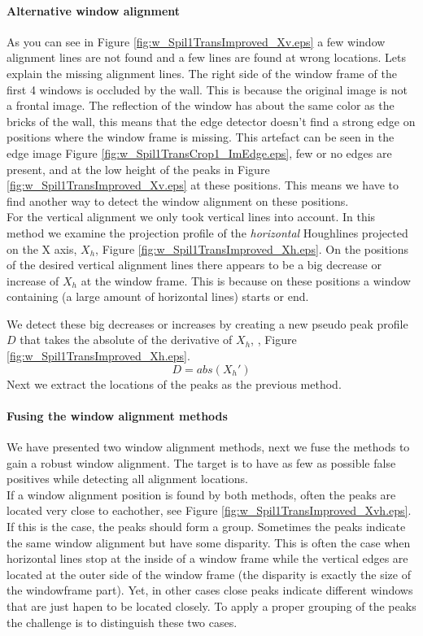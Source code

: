 \paragraph{Alternative window alignment}
As you can see in Figure \ref{fig:w_Spil1TransImproved_Xv.eps}
a few window alignment lines are not found and a few lines are found at wrong locations.
Lets explain the missing alignment lines.
The right side of the window frame of the first 4 windows is occluded by the
wall. This is because the original image is not a frontal image.
The reflection of the window has about the same color as the bricks of
the wall, this means that the edge detector
doesn't find a strong edge on positions where the window frame is missing.
This artefact can be seen in the edge image Figure \ref{fig:w_Spil1TransCrop1_ImEdge.eps}, few or no edges are present, and
at the low height of the peaks in Figure \ref{fig:w_Spil1TransImproved_Xv.eps} at these positions.
This means we have to find another way to detect the window alignment on these positions.\\

For the vertical alignment we only took vertical lines into account.
In this method we examine the projection profile of the \emph{horizontal} Houghlines
projected on the X axis, $X_h$, Figure \ref{fig:w_Spil1TransImproved_Xh.eps}.
On the positions of the desired vertical alignment lines there appears to be a 
big decrease or increase of $X_h$ at the window frame. This is because on these
positions a window containing (a large amount of horizontal lines) starts or end.

We detect these big decreases or increases by creating a new pseudo peak profile
$D$ that takes the absolute of the derivative of $X_h$, , Figure \ref{fig:w_Spil1TransImproved_Xh.eps}.
\[D = abs( X_{h}')\]
Next we extract the locations of the peaks as the previous method.

\paragraph{Fusing the window alignment methods}
We have presented two window alignment methods, next we fuse the methods to
gain a robust window alignment.
The target is to have as few as possible false positives while detecting all alignment locations.\\

If a window alignment position is found by both methods, often the peaks are
located very close to eachother, see Figure
\ref{fig:w_Spil1TransImproved_Xvh.eps}.  If this is the case, the peaks should
form a group.  Sometimes the peaks indicate the same window alignment but have
some disparity.  This is often the case when horizontal lines stop at the inside
of a window frame while the vertical edges are located at the outer side of the
window frame (the disparity is exactly the size of the windowframe part).  Yet,
in other cases close peaks indicate different windows that are just hapen to be
located closely.  To apply a proper grouping of the peaks the challenge is to
distinguish these two cases.

